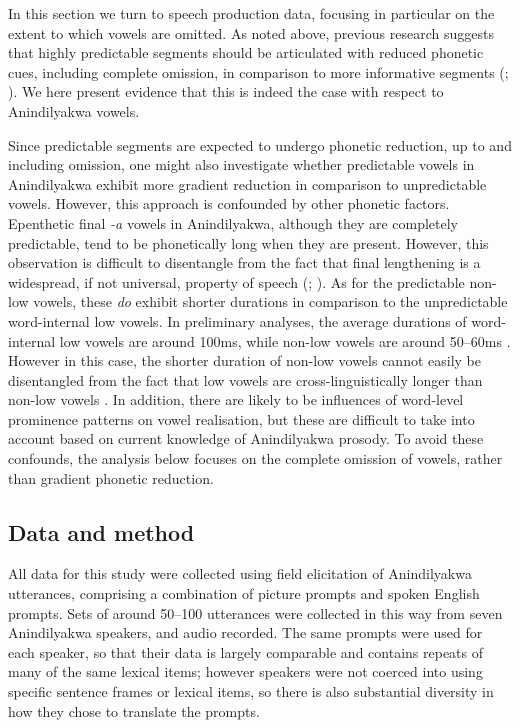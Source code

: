 \documentclass[output=paper,colorlinks,citecolor=brown]{langscibook}
\begin{document}
In this section we turn to speech production data, focusing in particular on the extent to which vowels are omitted. As noted above, previous research suggests that highly predictable segments should be articulated with reduced phonetic cues, including complete omission, in comparison to more informative segments (\citealt{Lindblom1990}; \citealt[119]{Hall2009,HallEtAl2018}). We here present evidence that this is indeed the case with respect to Anindilyakwa vowels.

Since predictable segments are expected to undergo phonetic reduction, up to and including omission, one might also investigate whether predictable vowels in Anindilyakwa exhibit more gradient reduction in comparison to unpredictable vowels. However, this approach is confounded by other phonetic factors. Epenthetic final \textit{{}-a} vowels in Anindilyakwa, although they are completely predictable, tend to be phonetically long when they are present. However, this observation is difficult to disentangle from the fact that final lengthening is a widespread, if not universal, property of speech (\citealt{fletcher2010prosody};  \citealt{seifart2021extent}). As for the predictable non-low vowels, these \textit{do} exhibit shorter durations in comparison to the unpredictable word-internal low vowels. In preliminary analyses, the average durations of word-internal low vowels are around 100ms, while non-low vowels are around 50--60ms \citep{billington_acoustic_nodate}. However in this case, the shorter duration of non-low vowels cannot easily be disentangled from the fact that low vowels are cross-linguistically longer than non-low vowels \citep{lindblom_vowel_1967}. In addition, there are likely to be influences of word-level prominence patterns on vowel realisation, but these are difficult to take into account based on current knowledge of Anindilyakwa prosody. To avoid these confounds, the analysis below focuses on the complete omission of vowels, rather than gradient phonetic reduction.

\subsection{Data and method}\label{sec:mansfield:5.1}
\largerpage
All data for this study were collected using field elicitation of Anindilyakwa utterances, comprising a combination of picture prompts and spoken English prompts. Sets of around 50–100 utterances were collected in this way from seven Anindilyakwa speakers, and audio recorded. The same prompts were used for each speaker, so that their data is largely comparable and contains repeats of many of the same lexical items; however speakers were not coerced into using specific sentence frames or lexical items, so there is also substantial diversity in how they chose to translate the prompts.
\end{document}
